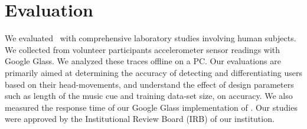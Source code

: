 \section{Evaluation}\label{sec:results}

We evaluated \systemname~with comprehensive laboratory studies involving 
human subjects. We collected from volunteer participants accelerometer sensor 
readings with Google Glass.
We analyzed these traces offline on a PC.
Our evaluations are primarily aimed at determining the accuracy of detecting 
and differentiating users based on their head-movements, and understand 
the effect of design parameters such as length of the music cue and training 
data-set size, on accuracy. We also measured the response time of our Google 
Glass implementation of \systemname.
Our studies were approved by the Institutional Review Board (IRB) of our 
institution.

